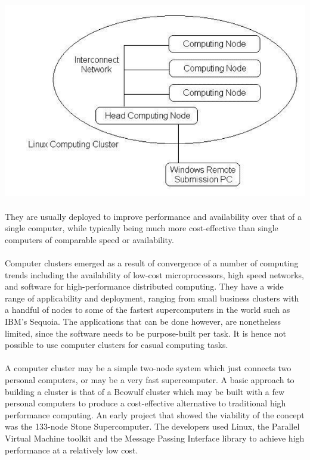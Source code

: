 \documentclass[a4paper,12pt]{article}
\begin{document}
\includegraphics[width = \textwidth]{clustertime_diag}
		
\paragraph{} They are usually deployed to improve performance and availability over that of a single computer, while typically being much more cost-effective than single computers of comparable speed or availability. 

\paragraph{} Computer clusters emerged as a result of convergence of a number of computing trends including the availability of low-cost microprocessors, high speed networks, and software for high-performance distributed computing. They have a wide range of applicability and deployment, ranging from small business clusters with a handful of nodes to some of the fastest supercomputers in the world such as IBM's Sequoia. The applications that can be done however, are nonetheless limited, since the software needs to be purpose-built per task. It is hence not possible to use computer clusters for casual computing tasks. 

\paragraph{} A computer cluster may be a simple two-node system which just connects two personal computers, or may be a very fast supercomputer. A basic approach to building a cluster is that of a Beowulf cluster which may be built with a few personal computers to produce a cost-effective alternative to traditional high performance computing. An early project that showed the viability of the concept was the 133-node Stone Supercomputer. The developers used Linux, the Parallel Virtual Machine toolkit and the Message Passing Interface library to achieve high performance at a relatively low cost. 
\end{document}
